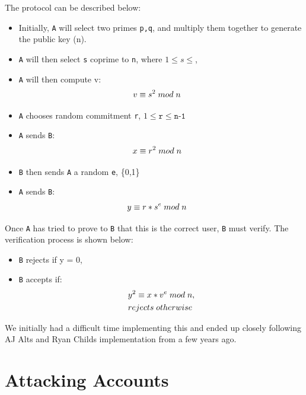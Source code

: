 \documentclass[10pt]{article}
\begin{document}
The protocol can be described below:
\begin{itemize}
    \item Initially, \texttt{A} will select two primes \texttt{p,q}, and multiply them together to generate the public key (n).
    \item \texttt{A} will then select \texttt{s} coprime to \texttt{n}, where $1 \leq s \leq$,
    \item \texttt{A} will then compute v:
        \begin{align*}
            v &\equiv s^{2} \thickspace mod \thickspace n
        \end{align*}
    \item \texttt{A} chooses random commitment \texttt{r}, $1 \leq \texttt{r} \leq \texttt{n-1}$
    \item \texttt{A} sends \texttt{B}:
        \begin{align*}
            x &\equiv r^{2} \thickspace mod \thickspace n
        \end{align*}
    \item \texttt{B} then sends \texttt{A} a random \texttt{e}, \{0,1\}
    \item \texttt{A} sends \texttt{B}:
        \begin{align*}
            y &\equiv r*s^{e} \thickspace mod \thickspace n
        \end{align*}
\end{itemize}
Once \texttt{A} has tried to prove to \texttt{B} that this is the correct user, \texttt{B} must verify.
The verification process is shown below:

\begin{itemize}
    \item \texttt{B} rejects if y = 0,
    \item \texttt{B} accepts if:
        \begin{align*}
            & y^{2} \equiv x*v^{e} \thickspace mod \thickspace n, \\
            & rejects \thickspace otherwise
        \end{align*}
\end{itemize}

We initially had a difficult time implementing this and ended up closely following
AJ Alts and Ryan Childs implementation \cite{aj} from a few years ago.

\newpage
\section{Attacking Accounts}
\end{document}
